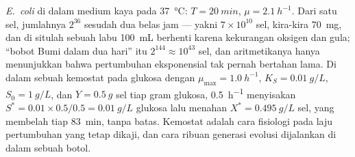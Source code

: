 \begin{example}\label{ex:b3:bacteriology:numbers}
\emph{E.~coli} di dalam medium kaya pada \qty{37}{\celsius}: $T = \qty{20}{min}$,
$\mu = \qty{2.1}{h^{-1}}$. Dari satu sel, jumlahnya $2^{36}$ sesudah dua belas
jam --- yakni $7\times 10^{10}$ sel, kira-kira \qty{70}{mg}, dan di situlah
sebuah labu \qty{100}{mL} berhenti karena kekurangan oksigen dan gula; ``bobot
Bumi dalam dua hari'' itu $2^{144}\approx 10^{43}$ sel, dan aritmetikanya hanya
menunjukkan bahwa pertumbuhan eksponensial tak pernah bertahan lama. Di dalam
sebuah kemostat pada glukosa dengan $\mu_{\max} = \qty{1.0}{h^{-1}}$, $K_{S} =
\qty{0.01}{g/L}$, $S_{0} = \qty{1}{g/L}$, dan $Y = \qty{0.5}{g}$ sel
tiap gram glukosa,  \qty{0.5}{h^{-1}} menyisakan $S^{*}
= 0.01\times 0.5/0.5 = \qty{0.01}{g/L}$ glukosa lalu menahan $X^{*} =
\qty{0.495}{g/L}$ sel, yang membelah tiap \qty{83}{min}, tanpa batas.
Kemostat adalah cara fisiologi pada laju pertumbuhan yang tetap dikaji, dan
cara ribuan generasi evolusi dijalankan di dalam sebuah botol.
\end{example}

